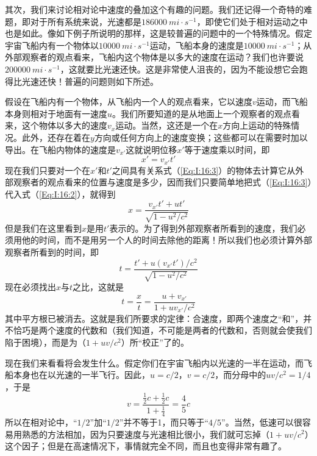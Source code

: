 其次，我们来讨论相对论中速度的叠加这个有趣的问题。我们还记得一个奇特的难题，即对于所有系统来说，光速都是$186000~mi \cdot s^{-1}$，即使它们处于相对运动之中也是如此。像如下例子所说明的那样，这是较普遍的问题中的一个特殊情况。假定宇宙飞船内有一个物体以$10000~mi \cdot s^{-1}$运动，飞船本身的速度是$10000~mi \cdot s^{-1}$；从外部观察者的观点看来，飞船内这个物体是以多大的速度在运动？我们也许要说$200000~mi \cdot s^{-1}$，这就要比光速还快。这是非常使人沮丧的，因为不能设想它会跑得比光速还快！普遍的问题则如下所述。

假设在飞船内有一个物体，从飞船内一个人的观点看来，它以速度$v$运动，而飞船本身则相对于地面有一速度$u$。我们所要知道的是从地面上一个观察者的观点看来，这个物体以多大的速度$v_x$运动。当然，这还是一个在$x$方向上运动的特殊情况。此外，还存在着在$y$方向或任何方向上的速度变换；这些都可以在需要时加以导出。在飞船内物体的速度是$v_{x'}$这就说明位移$x'$等于速度乘以时间，即
\begin{equation}
    \label{Eq:I:16:3}
    x'=v_{x'}t'
\end{equation}
现在我们只要对一个在$x'$和$t'$之间具有关系式（\ref{Eq:I:16:3}）的物体去计算它从外部观察者的观点看来的位置与速度是多少，因而我们只要简单地把式（\ref{Eq:I:16:3}）代入式（\ref{Eq:I:16:2}），就得到
\begin{equation}
    \label{Eq:I:16:4}
    x=\frac{v_{x'}t'+ut'}{\sqrt{1-u^2/c^2}}
\end{equation}
但是我们在这里看到$x$是用$t'$表示的。为了得到外部观察者所看到的速度，我们必须用他的时间，而不是用另一个人的时间去除他的距离！所以我们也必须计算外部观察者所看到的时间，即
\begin{equation}
    \label{Eq:I:16:5}
    t=\frac{t'+u(v_{x'}t')/c^2}{\sqrt{1-u^2/c^2}}
\end{equation}
现在必须找出$x$与$t$之比，这就是
\begin{equation}
    \label{Eq:I:16:6}
    t=\frac{x}{t}=\frac{u+v_{x'}}{1+uv_{x'}/c^2}
\end{equation}
其中平方根已被消去。这就是我们所要求的定律：合速度，即两个速度之“和”，并不恰巧是两个速度的代数和（我们知道，不可能是两者的代数和，否则就会使我们陷于困境），而是为（$1+uv/c^2$）所“校正”了的。

现在我们来看看将会发生什么。假定你们在宇宙飞船内以光速的一半在运动，而飞船本身也在以光速的一半飞行。因此，$u=c/2$，$v=c/2$，而分母中的$uv/c^2=1/4$，于是
\begin{equation*}
    v=\frac{\frac{1}{2}c+\frac{1}{2}c}{1+\frac{1}{4}}=\frac{4}{5}c
\end{equation*}
所以在相对论中，“$1/2$”加“$1/2$”并不等于1，而只等于“$4/5$”。当然，低速可以很容易用熟悉的方法相加，因为只要速度与光速相比很小，我们就可忘掉（$1+uv/c^2$）这个因子；但是在高速情况下，事情就完全不同，而且也变得非常有趣了。

